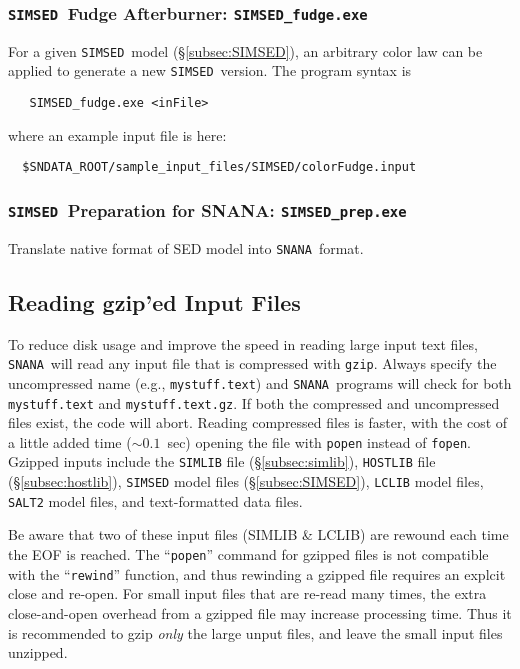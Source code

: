 \documentclass[12pt]{article}
\newcommand{\SIMSED}{{\tt SIMSED}}
\newcommand{\snana}{{\tt SNANA}}
\begin{document}
  \subsubsection{\SIMSED\ Fudge Afterburner:  
    {\tt SIMSED\_fudge.exe}  }
  \label{sssec:SIMSED_fudge}

For a given \SIMSED\ model (\S\ref{subsec:SIMSED}),
an arbitrary color law can be applied to generate
a new \SIMSED\ version. The program syntax is
%
\begin{verbatim}
   SIMSED_fudge.exe <inFile>
\end{verbatim}
%
where an example input file is here:
%
\begin{verbatim}
  $SNDATA_ROOT/sample_input_files/SIMSED/colorFudge.input 
\end{verbatim}


  \subsubsection{\SIMSED\ Preparation for SNANA:  
      {\tt SIMSED\_prep.exe}  }
  \label{sssec:SIMSED_prep}

Translate native format of SED model into \snana\ format.


  \subsection{ Reading gzip'ed Input Files }
  \label{subsec:gzip_inputs}

To reduce disk usage and improve the speed in reading large input
text files, \snana\ will read any input file that is compressed
with {\tt gzip}. Always specify the uncompressed name 
(e.g., {\tt mystuff.text}) and \snana\ programs will check for both
{\tt mystuff.text} and {\tt mystuff.text.gz}. If both the compressed
and uncompressed files exist, the code will abort. 
Reading compressed files is faster, with the cost of a little 
added time ($\sim 0.1$~sec) opening the file with {\tt popen} 
instead of {\tt fopen}. Gzipped inputs include the
{\tt SIMLIB} file (\S\ref{subsec:simlib}),
{\tt HOSTLIB} file (\S\ref{subsec:hostlib}),
{\tt SIMSED} model files (\S\ref{subsec:SIMSED}),
{\tt LCLIB} model files,
{\tt SALT2} model files,
and text-formatted data files. 

Be aware that two of these input files (SIMLIB \& LCLIB) are rewound
each time the EOF is reached. The ``{\tt popen}'' command for gzipped files
is not compatible with the ``{\tt rewind}'' function, and thus rewinding
a gzipped file requires an explcit close and re-open.
For small input files that are re-read many 
times, the extra close-and-open overhead from a gzipped file may
increase processing time. Thus it is recommended to gzip {\it only} the
large unput files, and leave the small input files unzipped.
\end{document}
